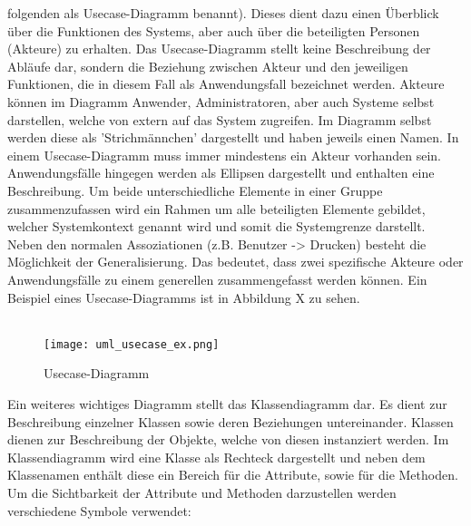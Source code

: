 folgenden als Usecase-Diagramm benannt).  Dieses dient dazu einen Überblick über die Funktionen des Systems, aber auch über die beteiligten Personen (Akteure) zu erhalten. Das Usecase-Diagramm stellt keine Beschreibung der Abläufe dar, sondern die Beziehung zwischen Akteur und den jeweiligen Funktionen, die in diesem Fall als Anwendungsfall bezeichnet werden. Akteure können im Diagramm Anwender, Administratoren, aber auch Systeme selbst darstellen, welche von extern auf das System zugreifen. Im Diagramm selbst werden diese als 'Strichmännchen' dargestellt und haben jeweils einen Namen. In einem Usecase-Diagramm muss immer mindestens ein Akteur vorhanden sein.
Anwendungsfälle hingegen werden als Ellipsen dargestellt und enthalten eine Beschreibung. Um beide unterschiedliche Elemente in einer Gruppe zusammenzufassen wird ein Rahmen um alle beteiligten Elemente gebildet, welcher Systemkontext genannt wird und somit die Systemgrenze darstellt. Neben den normalen Assoziationen (z.B. Benutzer -> Drucken) besteht die Möglichkeit der Generalisierung. Das bedeutet, dass zwei spezifische Akteure oder Anwendungsfälle zu einem generellen zusammengefasst werden können.
Ein Beispiel eines Usecase-Diagramms ist in Abbildung X zu sehen.\\
\\
\begin{figure}[H]
\centering
\texttt{[image: uml\_usecase\_ex.png]}
\caption{Usecase-Diagramm}
\label{fig:show_s1_s2_p1_n1}
\end{figure}
Ein weiteres wichtiges Diagramm stellt das Klassendiagramm dar. Es dient zur Beschreibung einzelner Klassen sowie deren Beziehungen untereinander. Klassen dienen zur Beschreibung der Objekte, welche von diesen instanziert werden. Im Klassendiagramm wird eine Klasse als Rechteck dargestellt und neben dem Klassenamen enthält diese ein Bereich für die Attribute, sowie für die Methoden. Um die Sichtbarkeit der Attribute und Methoden darzustellen werden verschiedene Symbole verwendet:\\

